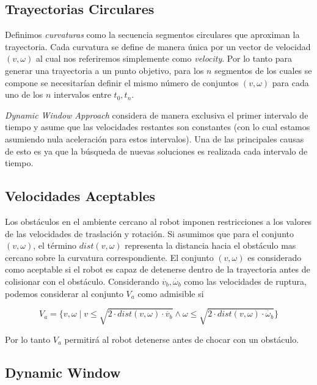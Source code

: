 \documentclass[12pt]{article}
\begin{document}

\subsection{Trayectorias Circulares}

Definimos \emph{curvaturas} como la secuencia segmentos circulares que aproximan la trayectoria. Cada curvatura se define de manera única por un vector de velocidad $(v, \omega)$ al cual nos referiremos simplemente como \emph{velocity}. Por lo tanto para generar una trayectoria a un punto objetivo, para los $n$ segmentos de los cuales se compone se necesitarían definir el mismo número de conjuntos $(v, \omega)$ para cada uno de los $n$ intervalos entre $t_0, t_n$.

\emph{Dynamic Window Approach} considera de manera exclusiva el primer intervalo de tiempo y asume que las velocidades restantes son constantes (con lo cual estamos asumiendo nula aceleración para estos intervalos). Una de las principales causas de esto es ya que la búsqueda de nuevas soluciones es realizada cada intervalo de tiempo.

\subsection{Velocidades Aceptables}

Los obstáculos en el ambiente cercano al robot imponen restricciones a los valores de las velocidades de traslación y rotación. Si asumimos que para el conjunto $(v, \omega)$, el término $dist(v, \omega)$ representa la distancia hacia el obstáculo mas cercano sobre la curvatura correspondiente. El conjunto $(v, \omega)$ es considerado como aceptable si el robot es capaz de detenerse dentro de la trayectoria antes de colisionar con el obstáculo. Considerando $\dot{v_b}, \dot{\omega_b}$ como las velocidades de ruptura, podemos considerar al conjunto $V_a$ como admisible si

\begin{equation}
	V_a = \{ 
		v, \omega \mid 
			v \leq \sqrt{2\cdot dist(v,\omega) \cdot \dot{v_b}} 
			\wedge
			\omega \leq \sqrt{2\cdot dist(v,\omega) \cdot \dot{\omega_b}} 
	\}
\end{equation}

Por lo tanto $V_a$ permitirá al robot detenerse antes de chocar con un obstáculo.

\subsection{Dynamic Window}
\end{document}
